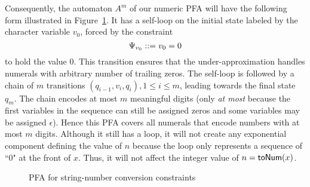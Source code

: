 \documentclass[sigplan,screen]{acmart}
\begin{document}
Consequently, the automaton $A^m$ of our numeric PFA will have the following form illustrated in Figure~\ref{fig:sfa_its}. 
It has a self-loop on the initial state labeled by the character variable $v_0$, 
forced by the constraint 
$$
\Psi_{v_0}::= v_0=0
$$ 
to hold the value $0$. 
This transition ensures that the under-approximation handles numerals with arbitrary number of trailing zeros.  
The self-loop is followed by a chain of $m$ transitions $(q_{i-1},v_i,q_{i}),1\leq i \leq m$, leading towards the final state $q_m$. 
The chain encodes at most $m$ meaningful digits (only \emph{at most} because the first variables in the sequence can still be assigned zeros and some variables may be assigned $\epsilon$). Hence this PFA covers all numerals that encode numbers with at most $m$ digits.
Although it still has a loop, it will not create any exponential component defining the value of $n$ because the loop only represents a sequence of ``0" at the front of $x$. Thus, it will not affect the integer value of $n=\mbox{\textsf{toNum}($x$)}$.

\begin{figure}
	
	\caption{PFA for string-number conversion constraints}
	\label{fig:sfa_its}
\end{figure}
\end{document}
